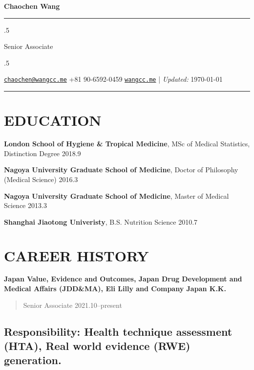 \documentclass[10pt,]{article}
\begin{document}
\centerline{\huge \bf Chaochen Wang}

\vspace{2 mm}

\hrule

\vspace{2 mm}

\moveleft.5\hoffset\centerline{Senior Associate}

\moveleft.5\hoffset\centerline{ \faEnvelopeO \hspace{1 mm} \href{mailto:}{\tt \href{mailto:chaochen@wangcc.me}{\nolinkurl{chaochen@wangcc.me}}} \hspace{1 mm}  \faPhone \hspace{1 mm}  +81
90-6592-0459  \hspace{1 mm}     \faGlobe \hspace{1 mm} \href{http://wangcc.me}{\tt wangcc.me}    | \emph{Updated:} \today}

\vspace{2 mm}

\hrule


\hypertarget{education}{%
\section{EDUCATION}\label{education}}

\textbf{London School of Hygiene \& Tropical Medicine}, MSc of Medical
Statistics, Distinction Degree \hfill 2018.9

\textbf{Nagoya University Graduate School of Medicine}, Doctor of
Philosophy (Medical Science) \hfill  2016.3

\textbf{Nagoya University Graduate School of Medicine}, Master of
Medical Science \hfill 2013.3

\textbf{Shanghai Jiaotong Univeristy}, B.S. Nutrition Science
\hfill 2010.7

\hypertarget{career-history}{%
\section{CAREER HISTORY}\label{career-history}}

\textbf{Japan Value, Evidence and Outcomes, Japan Drug Development and
Medical Affairs (JDD\&MA), Eli Lilly and Company Japan K.K.}

\begin{quote}
Senior Associate \hfill 2021.10--present
\end{quote}

\hypertarget{responsibility-health-technique-assessment-hta-real-world-evidence-rwe-generation.}{%
\subsection{Responsibility: Health technique assessment (HTA), Real
world evidence (RWE)
generation.}\label{responsibility-health-technique-assessment-hta-real-world-evidence-rwe-generation.}}
\end{document}
